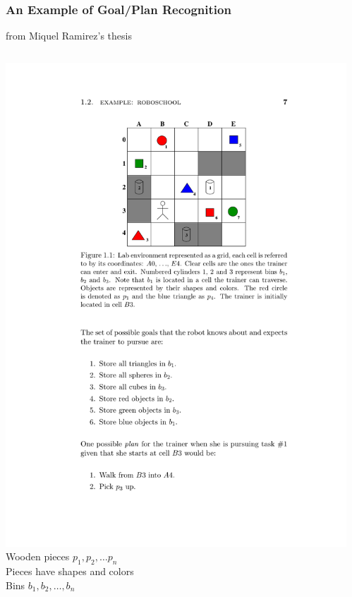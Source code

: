 \documentclass[usenames,dvipsnames]{beamer}
\begin{document}
	\begin{frame}[c]\frametitle{An Example of Goal/Plan Recognition}
		from Miquel Ramirez's thesis
		\begin{columns}
			\begin{column}{0.5\textwidth}
			    \includegraphics[width=.9\textwidth]{fig/roboschool-example.pdf}\\
				Wooden pieces $p_1,p_2, \dots p_n$\\
				Pieces have shapes and colors\\
				Bins $b_1, b_2, \dots, b_n$
			\end{column}
			\begin{column}{0.5\textwidth}
\end{column}
\end{columns}
\end{frame}
\end{document}
